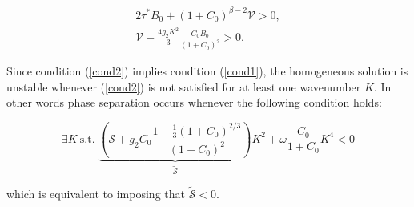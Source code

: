 \documentclass[12pt]{extarticle}
\begin{document}
\begin{eqnarray}
2\tau^* B_0 +(1+C_0)^{\beta-2}\mathcal{V}>0,\label{cond1}\\
\mathcal{V}-\frac{4g_2K^2}{3}\frac{C_0 B_0}{(1+C_0)^2}>0.\label{cond2}
\end{eqnarray}

Since condition (\ref{cond2}) implies condition (\ref{cond1}), the homogeneous solution is unstable whenever (\ref{cond2}) is not satisfied for at least one wavenumber $K$. In other words phase separation occurs whenever the following condition holds:

\begin{equation}
\exists K\ \text{s.t. } \underbrace{\left(\mathcal{S}+g_2C_0\frac{1-\frac{1}{3}(1+C_0)^{2/3}}{(1+C_0)^2}\right)}_{\tilde{\mathcal{S}}}K^2+\omega \frac{C_0}{1+C_0}K^4<0
\end{equation}

which is equivalent to imposing that $\tilde{\mathcal{S}}<0$. 
\end{document}
